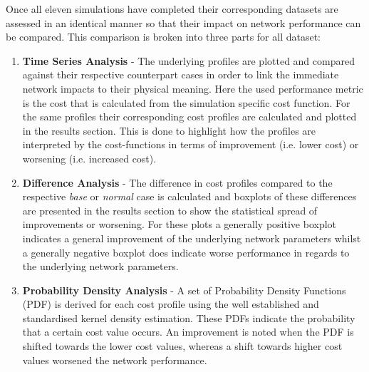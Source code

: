 Once all eleven simulations have completed their corresponding datasets are assessed in an identical manner so that their impact on network performance can be compared.
This comparison is broken into three parts for all dataset:

\begin{enumerate}
	\item \textbf{Time Series Analysis} - 
	The underlying profiles are plotted and compared against their respective counterpart cases in order to link the immediate network impacts to their physical meaning.
	Here the used performance metric is the cost that is calculated from the simulation specific cost function.
	For the same profiles their corresponding cost profiles are calculated and plotted in the results section.
	This is done to highlight how the profiles are interpreted by the cost-functions in terms of improvement (i.e. lower cost) or worsening (i.e. increased cost).
	\item \textbf{Difference Analysis} - 
	The difference in cost profiles compared to the respective \textit{base} or \textit{normal} case is calculated and boxplots of these differences are presented in the results section to show the statistical spread of improvements or worsening.
	For these plots a generally positive boxplot indicates a general improvement of the underlying network parameters whilst a generally negative boxplot does indicate worse performance in regards to the underlying network parameters.
	\item \textbf{Probability Density Analysis} - 
	A set of Probability Density Functions (PDF) is derived for each cost profile using the well established and standardised kernel density estimation.
	These PDFs indicate the probability that a certain cost value occurs.
	An improvement is noted when the PDF is shifted towards the lower cost values, whereas a shift towards higher cost values worsened the network performance.
\end{enumerate}





